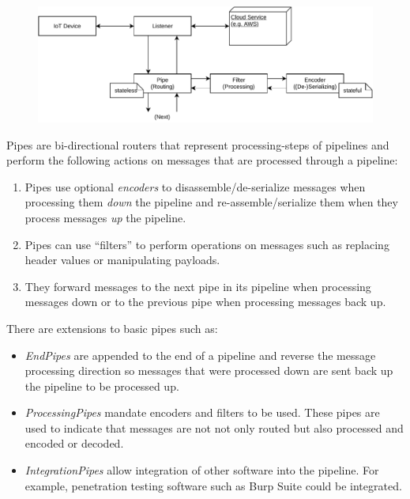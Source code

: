 \begin{figure}[h]
    \centering
    \includegraphics[width=14cm]{img/ch04/Architecture - Pipes and Filters4.pdf}
    \label{fig:design-pipes-and-filters}
\end{figure}
Pipes are bi-directional routers that represent processing-steps of pipelines and perform the following actions on messages that are processed through a pipeline:
\begin{enumerate}
    \item Pipes use optional \emph{encoders} to disassemble/de-serialize messages when processing them \emph{down} the pipeline and re-assemble/serialize them when they process messages \emph{up} the pipeline.
    \item Pipes can use \enquote{filters} to perform operations on messages such as replacing header values or manipulating payloads.
    \item They forward messages to the next pipe in its pipeline when processing messages down or to the previous pipe when processing messages back up.
\end{enumerate}
There are extensions to basic pipes such as:
\begin{itemize}
    \item \emph{EndPipes} are appended to the end of a pipeline and reverse the message processing direction so messages that were processed down are sent back up the pipeline to be processed up.
    \item \emph{ProcessingPipes} mandate encoders and filters to be used. These pipes are used to indicate that messages are not not only routed but also processed and encoded or decoded.
    \item \emph{IntegrationPipes} allow integration of other software into the pipeline. For example, penetration testing software such as Burp Suite could be integrated.
\end{itemize}

